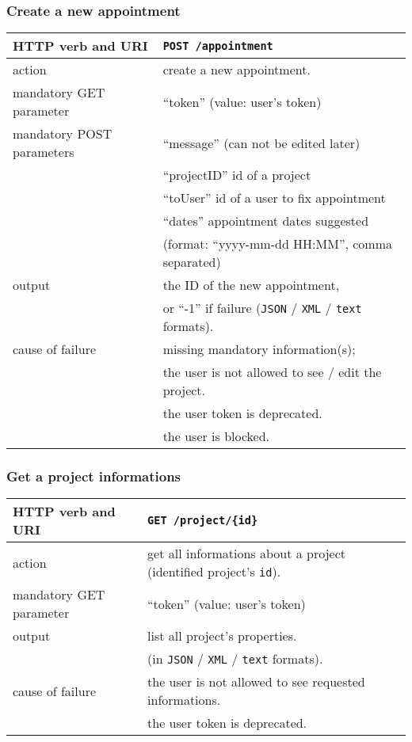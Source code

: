 \subsubsection{Create a new appointment}
\begin{tabular}{ | l | l | }
	\hline
	HTTP verb and URI & \texttt{POST /appointment} \\
	\hline
	action & create a new appointment. \\
	\hline
	mandatory GET parameter & ``token'' (value: user's token) \\
	\hline
	mandatory POST parameters & ``message'' (can not be edited later) \\
	\space & ``projectID'' id of a project \\		
	\space & ``toUser'' id of a user to fix appointment \\
	\space & ``dates'' appointment dates suggested \\
	\space & (format: ``yyyy-mm-dd HH:MM'', comma separated) \\
	\hline
	output & the ID of the new appointment, \\
	\space & or ``-1'' if failure (\texttt{JSON} / \texttt{XML} / \texttt{text} formats). \\
	\hline
	cause of failure & missing mandatory information(s);  \\
	\space & the user is not allowed to see / edit the project. \\
	\space & the user token is deprecated. \\
	\space & the user is blocked. \\
	\hline
\end{tabular}

\subsubsection{Get a project informations}
\begin{tabular}{ | l | l | }
	\hline
	HTTP verb and URI & \texttt{GET /project/\{id\}} \\
	\hline
	action & get all informations about a project (identified \via project’s \texttt{id}). \\
	\hline
	mandatory GET parameter & ``token'' (value: user's token) \\
	\hline
	output & list all project's properties.  \\
	\space & (in \texttt{JSON} / \texttt{XML} / \texttt{text} formats). \\
	\hline
	cause of failure & the user is not allowed to see requested informations. \\
	\space & the user token is deprecated. \\
	\hline
\end{tabular}
\newline

